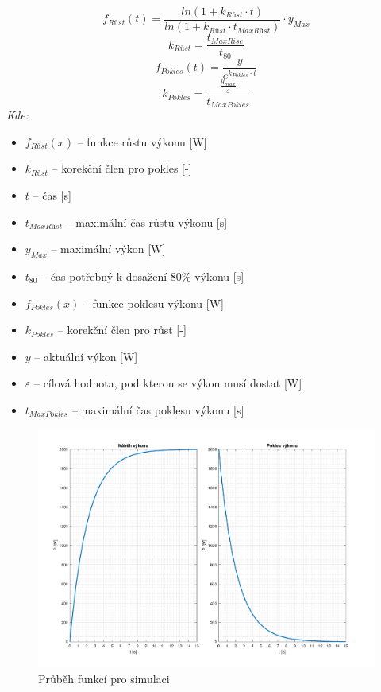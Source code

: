 \begin{equation}
    f_{Růst}(t) = \frac{ln(1 + k_{Růst} \cdot t)}{ln(1 + k_{Růst} \cdot t_{MaxRůst})} \cdot y_{Max}
    \label{eq:funkce_rust}
\end{equation} 
\begin{equation}
    k_{Růst} = \frac{t_{MaxRise}}{t_{80}}
    \label{eq:k_rust}
\end{equation}
\begin{equation}
    f_{Pokles}(t) = \frac{y}{e^{k_{Pokles} \cdot t}}
    \label{eq:funkce_pokles}
\end{equation}
\begin{equation}
    k_{Pokles} = \frac{\frac{y_{max}}{\varepsilon}}{t_{MaxPokles}}
    \label{eq:k_pokles}
\end{equation}
\newpage
\noindent\textit{Kde:}
\begin{itemize}
    \item $f_{Růst}(x)$ -- funkce růstu výkonu [W]
    \item $k_{Růst}$ -- korekční člen pro pokles [-]
    \item $t$ -- čas [s]
    \item $t_{MaxRůst}$ -- maximální čas růstu výkonu [s]
    \item $y_{Max}$ -- maximální výkon [W]
    \item $t_{80}$ -- čas potřebný k dosažení 80\% výkonu [s]
    \item $f_{Pokles}(x)$ -- funkce poklesu výkonu [W]
    \item $k_{Pokles}$ -- korekční člen pro růst [-] 
    \item $y$ -- aktuální výkon [W]
    \item $\varepsilon$ -- cílová hodnota, pod kterou se výkon musí dostat [W]
    \item $t_{MaxPokles}$ -- maximální čas poklesu výkonu [s]
\end{itemize}
\begin{figure}[!ht]
    \begin{center}
        \includegraphics[scale=0.52]{obrazky/simulace_funkce.pdf}
    \end{center}
    \caption[Průběh funkcí pro simulaci]{Průběh funkcí pro simulaci}
    \label{fig:simulace_funkce}
\end{figure}
